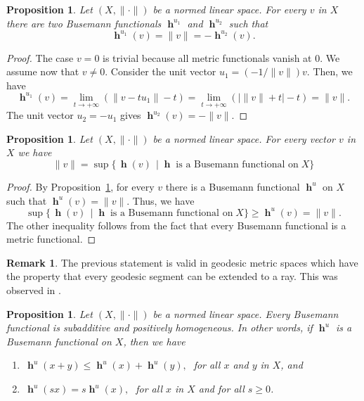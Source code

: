 \documentclass[a4paper,12pt]{article}
\newtheorem{prop}[thm]{Proposition}
\theoremstyle{definition}
\newtheorem{rem}[thm]{Remark}
\DeclareMathOperator{\h}{\mathbf{h}}
\newcommand{\abs}[1]{\lvert#1\rvert}
\newcommand{\norm}[1]{\lVert#1\rVert}
\numberwithin{equation}{section}
\begin{document}
\begin{prop}\label{prop: Bf1}
Let $(X,\norm{\cdot})$ be a normed linear space.
For every $v$ in $X$ there are two Busemann functionals $\h^{u_1}$ and $\h^{u_2}$ 
such that 
$$
	\h^{u_1}(v) = \norm{v} = -\h^{u_2}(v).
$$
\end{prop}

\begin{proof}
The case $v=0$ is trivial because all metric functionals vanish at $0$. We assume 
now that $v \neq 0$. Consider the unit vector $u_1=(-1/\norm{v})v$. Then, we have
$$
   \h^{u_1}(v) =\lim_{t\to+\infty}(\norm{v-tu_1}-t) 
        =\lim_{t\to+\infty}(\abs{\norm{v}+t} - t) 
        =\norm{v}.
$$
The unit vector $u_2 = -u_1$ gives $\h^{u_2}(v)=-\norm{v}$.
\end{proof}

\begin{prop}\label{prop:NormAsSupOfBusm}
Let $(X,\norm{\cdot})$ be a normed linear space.
For every vector $v$ in $X$ we have
$$
	\norm{v} = \sup\{\,\h(v)\, \mid \h\;\text{is a Busemann functional on}\; X\}
$$
\end{prop}
\begin{proof}
By Proposition~\ref{prop: Bf1}, for every $v$ there is a Busemann functional $\h^u$
on $X$ such that $\h^u(v)=\norm{v}$. Thus, we have
$$
	\sup\{\,\h(v)\, \mid \h\;\text{is a Busemann functional on}\; X\}
	\geq \h^u(v) = \norm{v}.
$$
The other inequality follows from the fact that every Busemann functional is a
metric functional.
\end{proof}

\begin{rem}
The previous statement is valid in geodesic metric spaces which have the property
that every geodesic segment can be extended to a ray. This was observed in
\cite[Section~6]{Karlsson2021}.
\end{rem}

\begin{prop}
Let $(X,\norm{\cdot})$ be a normed linear space.
Every Busemann functional is subadditive and positively homogeneous. In other 
words, if $\h^u$ is a Busemann functional on $X$, then we have 
\begin{enumerate}
\item $\,\h^u(x+y) \leq \h^u(x) + \h^u(y),\;$ for all $x$ and $y$ in $X$, and
     
\item $\,\h^u(sx)=s\h^u(x),\;$ for all $x$ in $X$ and for all $s\geq 0$.
\end{enumerate}
\end{prop}
\end{document}
